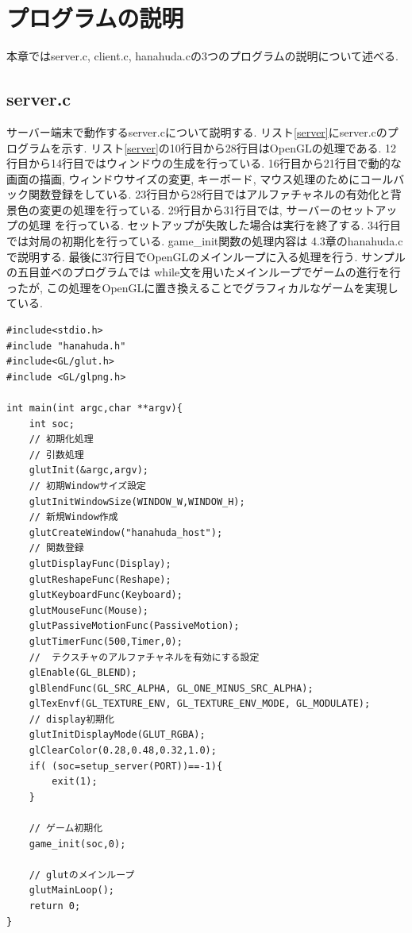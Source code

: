 \documentclass[a4j]{jarticle}
\begin{document}
    \section{プログラムの説明}
    本章ではserver.c, client.c, hanahuda.cの3つのプログラムの説明について述べる.
    \subsection{server.c}
    サーバー端末で動作するserver.cについて説明する. リスト\ref{server}にserver.cのプログラムを示す.
    リスト\ref{server}の10行目から28行目はOpenGLの処理である. 12行目から14行目ではウィンドウの生成を行っている.  
    16行目から21行目で動的な画面の描画, ウィンドウサイズの変更, キーボード, マウス処理のためにコールバック関数登録をしている.
    23行目から28行目ではアルファチャネルの有効化と背景色の変更の処理を行っている. 29行目から31行目では, サーバーのセットアップの処理
    を行っている. セットアップが失敗した場合は実行を終了する. 34行目では対局の初期化を行っている. game\_init関数の処理内容は
    4.3章のhanahuda.cで説明する. 最後に37行目でOpenGLのメインループに入る処理を行う. サンプルの五目並べのプログラムでは
    while文を用いたメインループでゲームの進行を行ったが, この処理をOpenGLに置き換えることでグラフィカルなゲームを実現している.
    \begin{lstlisting}[basicstyle=\ttfamily\footnotesize, frame=single,label=server,caption=server.c]
#include<stdio.h>
#include "hanahuda.h"
#include<GL/glut.h>
#include <GL/glpng.h>

int main(int argc,char **argv){
    int soc;
    // 初期化処理
    // 引数処理
    glutInit(&argc,argv);
    // 初期Windowサイズ設定
    glutInitWindowSize(WINDOW_W,WINDOW_H);
    // 新規Window作成
    glutCreateWindow("hanahuda_host");
    // 関数登録
    glutDisplayFunc(Display);
    glutReshapeFunc(Reshape);
    glutKeyboardFunc(Keyboard);
    glutMouseFunc(Mouse);
    glutPassiveMotionFunc(PassiveMotion);
    glutTimerFunc(500,Timer,0);
    //  テクスチャのアルファチャネルを有効にする設定
    glEnable(GL_BLEND);
    glBlendFunc(GL_SRC_ALPHA, GL_ONE_MINUS_SRC_ALPHA);
    glTexEnvf(GL_TEXTURE_ENV, GL_TEXTURE_ENV_MODE, GL_MODULATE);
    // display初期化
    glutInitDisplayMode(GLUT_RGBA);
    glClearColor(0.28,0.48,0.32,1.0);
    if( (soc=setup_server(PORT))==-1){
        exit(1);
    }

    // ゲーム初期化
    game_init(soc,0);

    // glutのメインループ
    glutMainLoop();
    return 0;
}
          \end{lstlisting}
\end{document}
